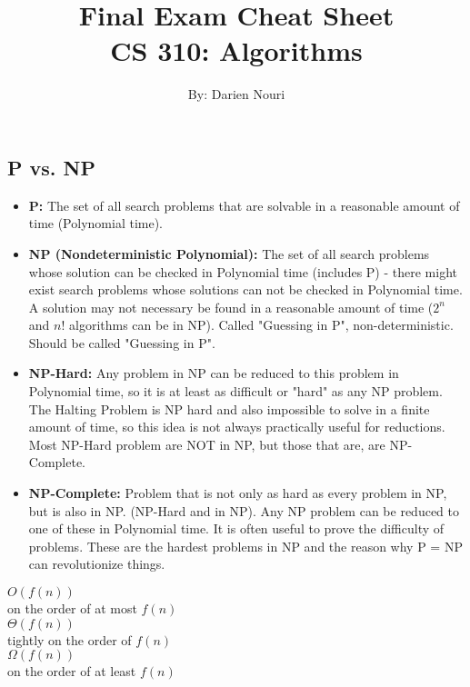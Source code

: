 \documentclass[landscape,7pt]{extarticle}
\title{Final Exam Cheat Sheet \\ CS 310: Algorithms}
\author{By: Darien Nouri}
\date{}
\begin{document}
\begin{multicols*}{3}
\setlength{\premulticols}{40pt}
\setlength{\postmulticols}{40pt}
\setlength{\multicolsep}{40pt}
\setlength{\columnsep}{40pt}
\footnotesize

\maketitle 

\section*{P vs. NP}

\begin{itemize}
    \item \textbf{P:} The set of all search problems that are solvable in a reasonable amount of time (Polynomial time).
    \item \textbf{NP (Nondeterministic Polynomial):} The set of all search problems whose solution can be checked in Polynomial time (includes P) - there might exist search problems whose solutions can not be checked in Polynomial time. A solution may not necessary be found in a reasonable amount of time ($2^n$ and $n!$ algorithms can be in NP). Called "Guessing in P", non-deterministic. Should be called "Guessing in P".
    \item \textbf{NP-Hard:} Any problem in NP can be reduced to this problem in Polynomial time, so it is at least as difficult or "hard" as any NP problem. The Halting Problem is NP hard and also impossible to solve in a finite amount of time, so this idea is not always practically useful for reductions. Most NP-Hard problem are NOT in NP, but those that are, are NP-Complete.
    \item \textbf{NP-Complete:} Problem that is not only as hard as every problem in NP, but is also in NP. (NP-Hard and in NP). Any NP problem can be reduced to one of these in Polynomial time. It is often useful to prove the difficulty of problems. These are the hardest problems in NP and the reason why P = NP can revolutionize things.
\end{itemize}

$O(f(n))$ \\
on the order of at most $f(n)$ \\
$\Theta(f(n))$ \\
tightly on the order of $f(n)$ \\
$\Omega(f(n))$ \\
on the order of at least $f(n)$


\end{multicols*}
\end{document}
